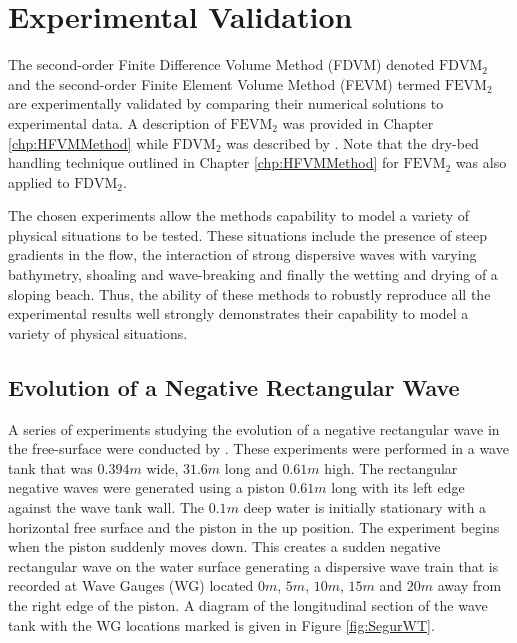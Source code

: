 
\chapter{Experimental Validation}
\label{chp:ExpMethodComp}

The second-order Finite Difference Volume Method (FDVM) denoted $\text{FDVM}_2$ and the second-order Finite Element Volume Method (FEVM) termed $\text{FEVM}_2$ are experimentally validated by comparing their numerical solutions to experimental data. A description of $\text{FEVM}_2$ was provided in Chapter \ref{chp:HFVMMethod} while $\text{FDVM}_2$ was described by \citet{Zoppou-etal-2017}. Note that the dry-bed handling technique outlined in Chapter \ref{chp:HFVMMethod} for $\text{FEVM}_2$ was also applied to $\text{FDVM}_2$. 

The chosen experiments allow the methods capability to model a variety of physical situations to be tested. These situations include the presence of steep gradients in the flow, the interaction of strong dispersive waves with varying bathymetry, shoaling and wave-breaking and finally the wetting and drying of a sloping beach. Thus, the ability of these methods to robustly reproduce all the experimental results well strongly demonstrates their capability to model a variety of physical situations. 

\section{Evolution of a Negative Rectangular Wave}
A series of experiments studying the evolution of a negative rectangular wave in the free-surface were conducted by \citet{Hammack-Segur-1978-337}. These experiments were performed in a wave tank that was $0.394m$ wide, $31.6m$ long and $0.61m$ high. The rectangular negative waves were generated using a piston $0.61m$ long with its left edge against the wave tank wall. The $0.1m$ deep water is initially stationary with a horizontal free surface and the piston in the up position. The experiment begins when the piston suddenly moves down. This creates a sudden negative rectangular wave on the water surface generating a dispersive wave train that is recorded at Wave Gauges (WG) located $0m$, $5m$, $10m$, $15m$ and $20m$ away from the right edge of the piston. A diagram of the longitudinal section of the wave tank with the WG locations marked is given in Figure \ref{fig:SegurWT}.

